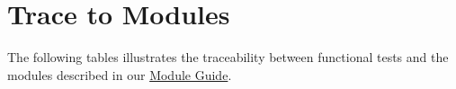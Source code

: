 \documentclass[12pt, titlepage]{article}
\begin{document}
\begin{table}[H]
  \centering
  \caption{Traceability Table for Non-Functional Test Cases and Requirements}
  \label{tab:NFRTraceReq}
\end{table}
		
\section{Trace to Modules}		

The following tables illustrates the traceability between functional  tests and the modules described in our \href{https://github.com/HKanwal/kapstone/blob/main/docs/Design/MG/MG.pdf}{Module Guide}.
\end{document}
